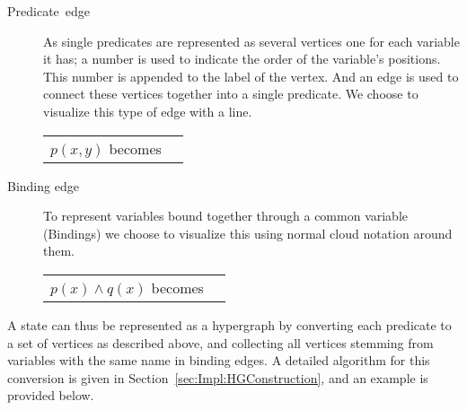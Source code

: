 \documentclass[../Master.tex]{subfiles}
\begin{document}
	\begin{description}
		\item [{Predicate~edge}] As  single predicates are represented as several vertices one for each variable
		it has; a number is used to indicate the order of the variable's
		positions. This number is appended to the label of the vertex. And an edge is used to connect these vertices together into a single predicate.
		We choose to visualize this type of edge with a line.\\
		\begin{tabular}{c  c}

			$p(x, y)$ becomes &
            \raisebox{-.5\height}{\resizebox{0.16\linewidth}{!}{}}
		\end{tabular}
		\item[{Binding edge}] To represent variables bound together through a common variable (Bindings) we
		choose to visualize this using normal cloud notation around them.\\
		\begin{tabular}{c  c}

			$p(x) \land q(x)$ becomes &
            \raisebox{-.5\height}{\resizebox{0.2\linewidth}{!}{}}
		\end{tabular}
	\end{description}

    A state can thus be represented as a hypergraph by converting each predicate to a set of vertices as described above, and collecting all vertices stemming from variables with the same name in binding edges. A detailed algorithm for this conversion is given in Section~\ref{sec:Impl:HGConstruction}, and an example is provided below.

%
%
\end{document}
